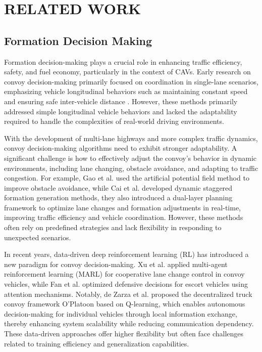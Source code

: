\section{RELATED WORK}
\subsection{Formation Decision Making} Formation decision-making plays a crucial role in enhancing traffic efficiency, safety, and fuel economy, particularly in the context of CAVs. Early research on convoy decision-making primarily focused on coordination in single-lane scenarios, emphasizing vehicle longitudinal behaviors such as maintaining constant speed and ensuring safe inter-vehicle distance \cite{jia2015survey,li2019platoon}. However, these methods primarily addressed simple longitudinal vehicle behaviors and lacked the adaptability required to handle the complexities of real-world driving environments.

With the development of multi-lane highways and more complex traffic dynamics, convoy decision-making algorithms need to exhibit stronger adaptability. A significant challenge is how to effectively adjust the convoy's behavior in dynamic environments, including lane changing, obstacle avoidance, and adapting to traffic congestion. For example, Gao et al. \cite{gao2019multi} used the artificial potential field method to improve obstacle avoidance, while Cai et al. \cite{cai2019multi,cai2021formation} developed dynamic staggered formation generation methods, they also introduced a dual-layer planning framework to optimize lane changes and formation adjustments in real-time, improving traffic efficiency and vehicle coordination. However, these methods often rely on predefined strategies and lack flexibility in responding to unexpected scenarios.

In recent years, data-driven deep reinforcement learning (RL) has introduced a new paradigm for convoy decision-making. Xu et al. \cite{xu2022connected} applied multi-agent reinforcement learning (MARL) for cooperative lane change control in convoy vehicles, while Fan et al. \cite{fan2023twin} optimized defensive decisions for escort vehicles using attention mechanisms. Notably, de Zarza et al. \cite{de2023decentralized} proposed the decentralized truck convoy framework O'Platoon based on Q-learning, which enables autonomous decision-making for individual vehicles through local information exchange, thereby enhancing system scalability while reducing communication dependency. These data-driven approaches offer higher flexibility but often face challenges related to training efficiency and generalization capabilities.

